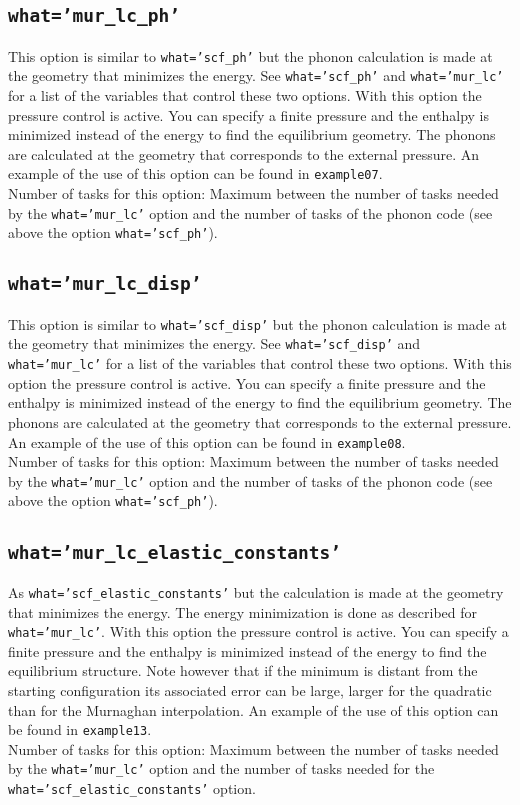 \documentclass[12pt,a4paper]{article}
\begin{document}
\subsection{\color{web-blue}\texttt{what='mur\_lc\_ph'}}
This option is similar to \texttt{what='scf\_ph'} but the phonon calculation
is made at the geometry that minimizes the energy.
See \texttt{what='scf\_ph'} and \texttt{what='mur\_lc'} for a
list of the variables that control these two options. 
With this option the pressure control is active. You can specify a
finite pressure and the enthalpy is minimized instead of the
energy to find the equilibrium geometry. The phonons are calculated
at the geometry that corresponds to the external pressure.
An example of the use of this option can be found in \texttt{example07}. \\
Number of tasks for this option: Maximum between the number of tasks 
needed by the \texttt{what='mur\_lc'} option and the number
of tasks of the phonon code (see above the option \texttt{what='scf\_ph'}).

\subsection{\color{web-blue}\texttt{what='mur\_lc\_disp'}}
This option is similar to \texttt{what='scf\_disp'} but the phonon calculation
is made at the geometry that minimizes the energy.
See \texttt{what='scf\_disp'} and \texttt{what='mur\_lc'} for a
list of the variables that control these two options. 
With this option the pressure control is active. You can specify a
finite pressure and the enthalpy is minimized instead of the
energy to find the equilibrium geometry. The phonons are calculated
at the geometry that corresponds to the external pressure.
An example of the use of this option can be found in \texttt{example08}. \\
Number of tasks for this option: Maximum between the number of tasks  
needed by the \texttt{what='mur\_lc'} option and the number
of tasks of the phonon code (see above the option \texttt{what='scf\_ph'}).

\subsection{\color{web-blue}\texttt{what='mur\_lc\_elastic\_constants'}}
As \texttt{what='scf\_elastic\_constants'} but the calculation is made at the
geometry that minimizes the energy. The energy minimization is 
done as described for \texttt{what='mur\_lc'}. 
With this option the pressure control is active. You can specify a
finite pressure and the enthalpy is minimized instead of the
energy to find the equilibrium structure. Note however that if the 
minimum is distant from the starting configuration its associated error 
can be large, larger for the quadratic than for the Murnaghan interpolation. 
An example of the use of this 
option can be found in \texttt{example13}. \\
Number of tasks for this option: Maximum between the number of tasks
needed by the \texttt{what='mur\_lc'} option and the number of tasks
needed for the \texttt{what='scf\_elastic\_constants'} option.
\end{document}
